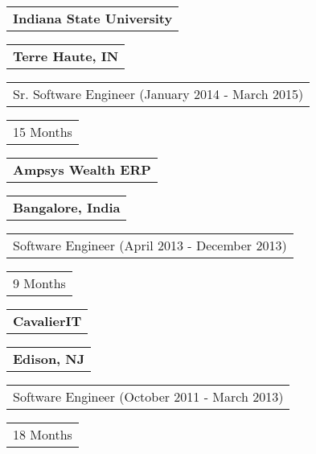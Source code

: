\documentclass[letterpaper,9pt]{article}
\begin{document}

    \vspace{0.25cm}
    \noindent
    \begin{tabular}[t]{@{}l}
    	\textbf{\color{black}Indiana State University}
    \end{tabular}
    \hfill
    \begin{tabular}[t]{l@{}}
    	\textbf{\color{black}Terre Haute, IN}
    \end{tabular}
    \noindent\newline
    \begin{tabular}[t]{@{}l}
    	Sr. Software Engineer (January 2014 - March 2015)
    \end{tabular}
    \hfill
    \begin{tabular}[t]{l@{}}
    	15 Months
    \end{tabular}


    \vspace{0.25cm}
    \noindent
    \begin{tabular}[t]{@{}l}
    \textbf{\color{black}Ampsys Wealth ERP}
    \end{tabular}
    \hfill
    \begin{tabular}[t]{l@{}}
    \textbf{\color{black}Bangalore, India}
    \end{tabular}
    \noindent\newline
    \begin{tabular}[t]{@{}l}
    Software Engineer (April 2013 - December 2013)
    \end{tabular}
    \hfill
    \begin{tabular}[t]{l@{}}
    9 Months
    \end{tabular}


    \vspace{0.25cm}
    \noindent
    \begin{tabular}[t]{@{}l}
    \textbf{\color{black}CavalierIT}
    \end{tabular}
    \hfill
    \begin{tabular}[t]{l@{}}
    \textbf{\color{black}Edison, NJ}
    \end{tabular}
    \noindent\newline
    \begin{tabular}[t]{@{}l}
    Software Engineer (October 2011 - March 2013)
    \end{tabular}
    \hfill
    \begin{tabular}[t]{l@{}}
    18 Months
    \end{tabular}
\end{document}

